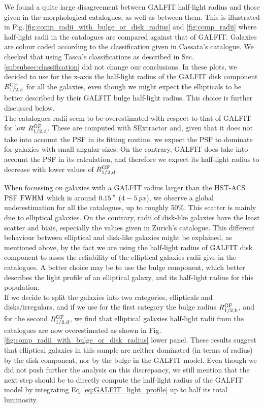 We found a quite large disagreement between GALFIT half-light radius and those given in the morphological catalogues, as well as between them. This is illustrated in Fig.\,\ref{fig:comp_radii_with_bulge_or_disk_radius} and \ref{fig:comp_radii} where half-light radii in the catalogues are compared against that of GALFIT. Galaxies are colour coded according to the classification given in Cassata's catalogue. We checked that using Tasca's classifications as described in Sec.\,\ref{subsubsec:classification} did not change our conclusions. In these plots, we decided to use for the x-axis the half-light radius of the GALFIT disk component $R_{1/2 , \rm{d}}^{\rm{GF}}$ for all the galaxies, even though we might expect the ellipticals to be better described by their GALFIT bulge half-light radius. This choice is further discussed below.\\

The catalogues radii seem to be overestimated with respect to that of GALFIT for low $R_{1/2 , \rm{d}}^{\rm{GF}}$. These are computed with SExtractor and, given that it does not take into account the PSF in its fitting routine, we expect the PSF to dominate for galaxies with small angular sizes. On the contrary, GALFIT does take into account the PSF in its calculation, and therefore we expect its half-light radius to decrease with lower values of $R_{1/2 , \rm{d}}^{\rm{GF}}$. 

When focussing on galaxies with a GALFIT radius larger than the HST-ACS PSF $\rm{FWHM}$ which is around $\SI{0.15}{"}$ ($4 - \SI{5}{px}$), we observe a global underestimation for all the catalogues, up to roughly 50\%. This scatter is mainly due to elliptical galaxies. On the contrary, radii of disk-like galaxies have the least scatter and biais, especially the values given in Zurich's catalogue. This different behaviour between elliptical and disk-like galaxies might be explained, as mentioned above, by the fact we are using the half-light radius of GALFIT disk component to asses the reliability of the elliptical galaxies radii give in the catalogues. A better choice may be to use the bulge component, which better describes the light profile of an elliptical galaxy, and its half-light radius for this population.\\

If we decide to split the galaxies into two categories, ellipticals and disks/irregulars, and if we use for the first category the bulge radius $R_{1/2 , \rm{b}}^{\rm{GF}}$, and for the second $R_{1/2 , \rm{d}}^{\rm{GF}}$, we find that elliptical galaxies half-light radii from the catalogues are now overestimated as shown in Fig.\,\ref{fig:comp_radii_with_bulge_or_disk_radius} lower panel. These results suggest that elliptical galaxies in this sample are neither dominated (in terms of radius) by the disk component, nor by the bulge in the GALFIT model. Even though we did not push further the analysis on this discrepancy, we still mention that the next step should be to directly compute the half-light radius of the GALFIT model by integrating Eq.\,\ref{eq:GALFIT_light_profile} up to half its total luminosity.


